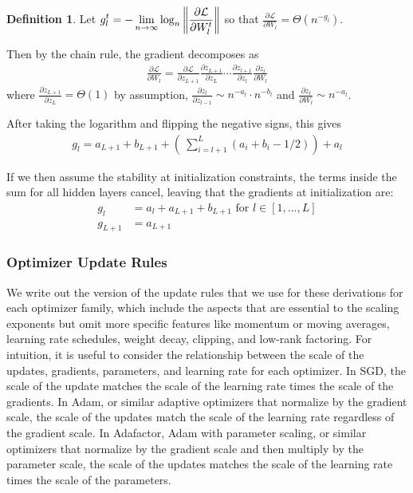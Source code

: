 \documentclass{article}
\theoremstyle{plain}
\theoremstyle{definition}
\newtheorem{appendixdef}{Definition}[section]
\theoremstyle{remark}
\newcommand{\partialloss}[1]{\frac{\partial \mathcal{L}}{\partial #1}}
\newcommand{\partialfrac}[2]{\frac{\partial #1}{\partial #2}}
\begin{document}
\begin{appendixdef}
Let $\displaystyle g_l^t = -\lim_{n \rightarrow \infty} \log_n \norm{\frac{\partial \mathcal{L}}{\partial W_l^t}}$ so that $\frac{\partial \mathcal{L}}{\partial W_l} = \Theta(n ^ {-g_l})$.
\end{appendixdef}

Then by the chain rule, the gradient decomposes as
\begin{align*}
    \partialloss{W_l} = \partialloss{z_{L+1}} \partialfrac{z_{L+1}}{z_L} \cdots \partialfrac{z_{l+1}}{z_l} \partialfrac{z_l}{W_l}
\end{align*}
where $\partialfrac{z_{L+1}}{z_L} = \Theta(1)$ by assumption, $\partialfrac{z_{l}}{z_{l-1}} \sim n^{-a_{l}} \cdot n^{-b_{l}}$ and $\partialfrac{z_l}{W_l} \sim n^{-a_l}$.

After taking the logarithm and flipping the negative signs, this gives
\begin{align*}
    g_l = a_{L+1} + b_{L+1} + \left(\: \sum_{i = l+1} ^{L} (a_i + b_i - 1/2) \right) + a_l
\end{align*}

If we then assume the stability at initialization constraints, the terms inside the sum for all hidden layers cancel, leaving that the gradients at initialization are:
\begin{align*}
    g_l &= a_l + a_{L+1} + b_{L+1} \textrm{ for } l \in [1, \ldots, L]\\
    g_{L+1} &= a_{L+1}
\end{align*}

\subsubsection{Optimizer Update Rules}
\label{app:theory_optimizer_updates}
We write out the version of the update rules that we use for these derivations for each optimizer family, which include the aspects that are essential to the scaling exponents but omit more specific features like momentum or moving averages, learning rate schedules, weight decay, clipping, and low-rank factoring. For intuition, it is useful to consider the relationship between the scale of the updates, gradients, parameters, and learning rate for each optimizer. In SGD, the scale of the update matches the scale of the learning rate times the scale of the gradients. In Adam, or similar adaptive optimizers that normalize by the gradient scale, the scale of the updates match the scale of the learning rate regardless of the gradient scale. In Adafactor, Adam with parameter scaling, or similar optimizers that normalize by the gradient scale and then multiply by the parameter scale, the scale of the updates matches the scale of the learning rate times the scale of the parameters.
\end{document}
